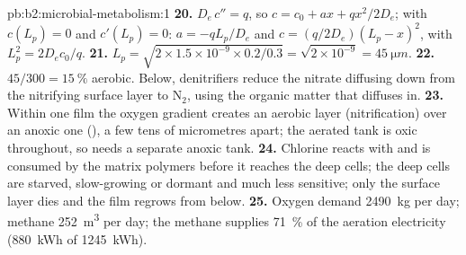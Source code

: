 \begin{solution}{pb:b2:microbial-metabolism:1}
\textbf{20.} $D_e\,c'' = q$, so $c = c_0 + ax + qx^2/2D_e$; with
$c(L_p) = 0$ and $c'(L_p) = 0$: $a = -qL_p/D_e$ and $c =
(q/2D_e)(L_p - x)^2$, with $L_p^2 = 2D_ec_0/q$.
\textbf{21.} $L_p = \sqrt{2\times 1.5\times 10^{-9}\times 0.2/0.3} =
\sqrt{2\times 10^{-9}} = \qty{45}{\micro m}$.
\textbf{22.} $45/300 = \qty{15}{\%}$ aerobic. Below, denitrifiers
reduce the nitrate diffusing down from the nitrifying surface layer
to $\mathrm{N_2}$, using the organic matter that diffuses in.
\textbf{23.} Within one film the oxygen gradient creates an aerobic
layer (nitrification) over an anoxic one (), a few
tens of micrometres apart; the aerated tank is oxic throughout, so
 needs a separate anoxic tank.
\textbf{24.} Chlorine reacts with and is consumed by the matrix
polymers before it reaches the deep cells; the deep cells are
starved, slow-growing or dormant and much less sensitive; only the
surface layer dies and the film regrows from below.
\textbf{25.} Oxygen demand \qty{2490}{kg} per day; methane
\qty{252}{m^3} per day; the methane supplies \qty{71}{\%} of the
aeration electricity (\qty{880}{kWh} of \qty{1245}{kWh}).
\end{solution}
